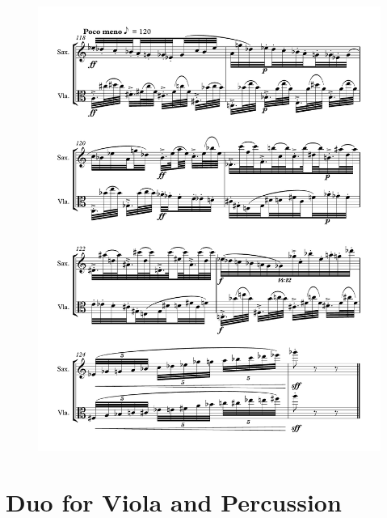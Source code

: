 \begin{figure}[htbp]
    \centering
	\includegraphics[width=6.5in]{figures/Sax_Viola_32.pdf}
\end{figure}

\chapter{Duo for Viola and Percussion}

